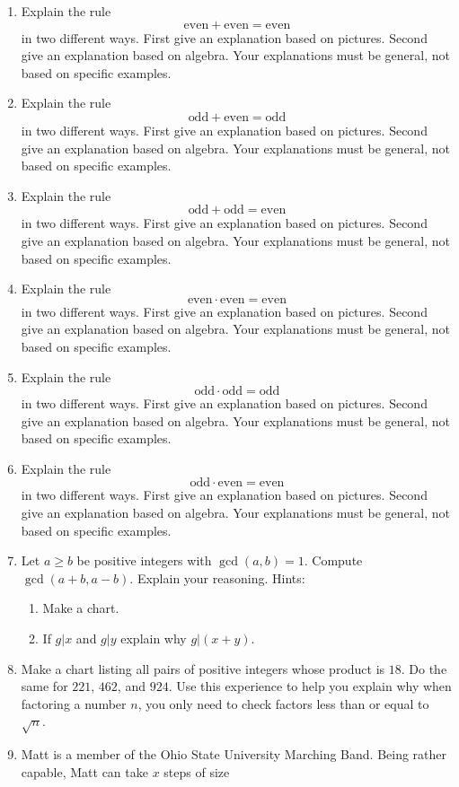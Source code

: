 \begin{problems}
\begin{enumerate}
\item Explain the rule
\[
\text{even} + \text{even} = \text{even}
\]
in two different ways. First give an explanation based on
pictures. Second give an explanation based on algebra. Your
explanations must be general, not based on specific examples.
\item Explain the rule
\[
\text{odd} + \text{even} = \text{odd}
\]
in two different ways. First give an explanation based on
pictures. Second give an explanation based on algebra.  Your
explanations must be general, not based on specific examples.
\item Explain the rule
\[
\text{odd} + \text{odd} = \text{even}
\]
in two different ways. First give an explanation based on
pictures. Second give an explanation based on algebra. Your
explanations must be general, not based on specific examples.
\item Explain the rule
\[
\text{even} \cdot \text{even} = \text{even}
\]
in two different ways. First give an explanation based on
pictures. Second give an explanation based on algebra. Your
explanations must be general, not based on specific examples.
\item Explain the rule
\[
\text{odd} \cdot \text{odd} = \text{odd}
\]
in two different ways. First give an explanation based on
pictures. Second give an explanation based on algebra. Your
explanations must be general, not based on specific examples.
\item Explain the rule
\[
\text{odd} \cdot \text{even} = \text{even}
\]
in two different ways. First give an explanation based on
pictures. Second give an explanation based on algebra. Your
explanations must be general, not based on specific examples.
\item Let $a\ge b$ be positive integers with $\gcd(a,b) =1$. Compute
  $\gcd(a +b, a-b)$. Explain your reasoning. Hints: 
\begin{enumerate}
\item Make a chart.
\item If $g|x$ and $g|y$ explain why $g|(x+y)$.
\end{enumerate}
\item Make a chart listing all pairs of positive integers whose
  product is $18$. Do the same for $221$, $462$, and $924$. Use this
  experience to help you explain why when factoring a number $n$, you
  only need to check factors less than or equal to $\sqrt{n}$.
\item \label{P:NNP}Matt is a member of the Ohio State University
  Marching Band. Being rather capable, Matt can take $x$ steps of size

\end{enumerate}
\end{problems}
